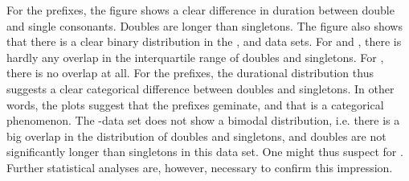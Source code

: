  
For the prefixes, the figure shows a clear difference in duration between double and single consonants. Doubles are longer than singletons. The figure also shows that there is a clear binary distribution in the ,  and data sets.  For  and , there is hardly any overlap in the interquartile range of doubles and singletons. For , there is no overlap at all. For the prefixes, the durational distribution thus suggests a clear categorical difference between doubles and singletons. In other words, the plots suggest that the prefixes geminate, and that  is a categorical phenomenon. 
The -data set does not show a bimodal distribution, i.e. there is a big overlap in the distribution of doubles and singletons, and doubles are not significantly longer than singletons in this data set. One might thus suspect  for . Further statistical analyses are, however, necessary to confirm this impression.


